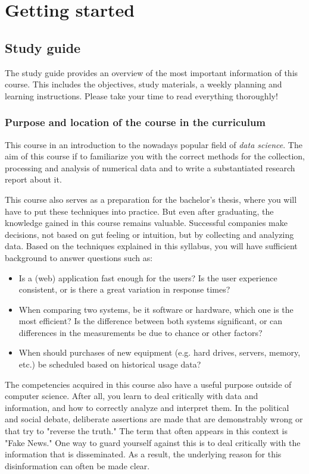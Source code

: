 \chapter{Getting started}
\label{ch:getting-started}

\section{Study guide}

The study guide provides an overview of the most important information of this course.
This includes the objectives, study materials, a weekly planning and learning instructions.
Please take your time to read everything thoroughly!

\subsection{Purpose and location of the course in the curriculum}

This course in an introduction to the nowadays popular field of \emph{data science}. The aim of this course if to familiarize you with the correct methods for the collection, processing and analysis of numerical data and to write a substantiated research report about it.

This course also serves as a preparation for the bachelor's thesis, where you will have to put these techniques into practice.
But even after graduating, the knowledge gained in this course remains valuable. 
Successful companies make decisions, not based on gut feeling or intuition, but by collecting and analyzing data. 
Based on the techniques explained in this syllabus, you will have sufficient background to answer questions such as:

\begin{itemize}
    \item Is a (web) application fast enough for the users? Is the user experience consistent, or is there a great variation in response times?
    \item When comparing two systems, be it software or hardware, which one is the most efficient? Is the difference between both systems significant, or can differences in the measurements be due to chance or other factors?
    \item When should purchases of new equipment (e.g. hard drives, servers, memory, etc.) be scheduled based on historical usage data?
\end{itemize}

The competencies acquired in this course also have a useful purpose outside of computer science. 
After all, you learn to deal critically with data and information, and how to correctly analyze and interpret them. 
In the political and social debate, deliberate assertions are made that are demonstrably wrong or that try to "reverse the truth." 
The term that often appears in this context is "Fake News." 
One way to guard yourself against this is to deal critically with the information that is disseminated. 
As a result, the underlying reason for this disinformation can often be made clear.

